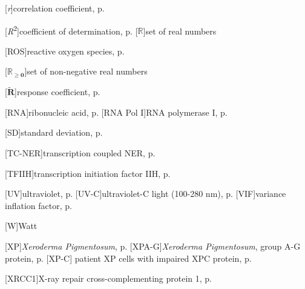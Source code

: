 \begin{acronym}
[\textit{r}]{correlation coefficient, p. \pageref{fig:ProteinDist}}  

[\textit{R}\textsuperscript{2}]{coefficient of determination, p. 
\pageref{fig:DNArepairKinetic}}
[$ \boldsymbol{\mathds{R}} $]{set of real numbers}

[ROS]{reactive oxygen species, p. \pageref{sec:intro_reg_repair}}

[$ \boldsymbol{\mathds{R}_{\geq 0} } $]{set of non-negative real numbers}

[$\mathbf{\tilde{R}}$]{response coefficient, p. \pageref{sec:reponseC}}

[RNA]{ribonucleic acid, p. \pageref{sec:intro_reg_repair}}
[RNA Pol I]{RNA polymerase I, p. \pageref{sec:RNA_pol}}

[SD]{standard deviation, p. 
\pageref{fig:DNArepairKinetic}}

[TC-NER]{transcription coupled NER, p. \pageref{sec:NERmechanism}}


[TFIIH]{transcription initiation factor IIH, p. \pageref{sec:NERmechanism}}




[UV]{ultraviolet, p. \pageref{sec:intro_reg_repair}}
[UV-C]{ultraviolet-C light (100-280 nm), p. \pageref{chap:quantData}}
[VIF]{variance inflation factor, p. \pageref{sec:vif}}

[W]{Watt}

[XP]{\textit{Xeroderma Pigmentosum}, p. \pageref{sec:NERmechanism}}
[XPA-G]{\textit{Xeroderma Pigmentosum}, group A-G protein, p. \pageref{sec:NERmechanism}}
[XP-C]{ patient XP cells with impaired XPC protein, p. \pageref{sec_DNAresynthesis}}

[XRCC1]{X-ray repair cross-complementing protein 1, p. \pageref{sec:NERmechanism}}

\end{acronym}